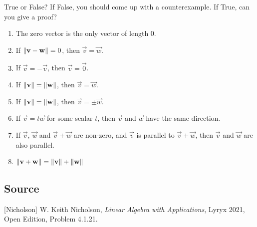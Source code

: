 \documentclass{ximera}
\author{}
\begin{document}
\begin{exercise}
True or False?  If False, you should come up with a counterexample.  If True, can you give a proof?

\begin{enumerate}
    \item The zero vector is the only vector of length 0.
    \begin{multipleChoice}
 \end{multipleChoice}
 \item If $\left\lVert\mathbf{v}-\mathbf{w}\right\rVert=0$, then $\vec{v}=\vec{w}$.
 \begin{multipleChoice}
 \end{multipleChoice}
 \item If $\vec{v}=-\vec{v}$, then $\vec{v}=\vec{0}$.
 \begin{multipleChoice}
 \end{multipleChoice}
 \item If $\left\lVert\mathbf{v}\right\rVert=\left\lVert\mathbf{w}\right\rVert$, then $\vec{v}=\vec{w}$.
 \begin{multipleChoice}
 \end{multipleChoice}
 \item If $\left\lVert\mathbf{v}\right\rVert=\left\lVert\mathbf{w}\right\rVert$, then $\vec{v}=\pm\vec{w}$.
 \begin{multipleChoice}
 \end{multipleChoice}
 \item If $\vec{v}=t\vec{w}$ for some scalar $t$, then $\vec{v}$ and $\vec{w}$ have the same direction.
  \begin{multipleChoice}
 \end{multipleChoice}
 \item If $\vec{v}$, $\vec{w}$ and $\vec{v}+\vec{w}$ are non-zero, and $\vec{v}$ is parallel to $\vec{v}+\vec{w}$, then $\vec{v}$ and $\vec{w}$ are also parallel.
 \begin{multipleChoice}
 \end{multipleChoice}
 \item $\left\lVert\mathbf{v}+\mathbf{w}\right\rVert=\left\lVert\mathbf{v}\right\rVert+\left\lVert\mathbf{w}\right\rVert$
 \begin{multipleChoice}
 \end{multipleChoice}
\end{enumerate}
 
\end{exercise}

\subsection*{Source}
[Nicholson] W. Keith Nicholson, {\it Linear Algebra with Applications}, Lyryx 2021, Open Edition, Problem 4.1.21.
\end{document}

